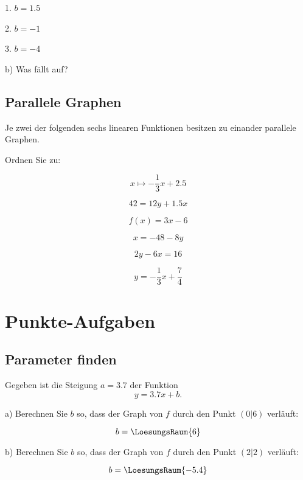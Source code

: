 1. $b=1.5$

2. $b=-1$

3. $b= -4$


b) Was fällt auf?
\newpage
\subsection{Parallele Graphen}
Je zwei der folgenden sechs linearen Funktionen besitzen zu einander parallele
Graphen.

Ordnen Sie zu:

$$x\mapsto -\frac13 x + 2.5$$

$$42 = 12y + 1.5x$$

$$f(x) = 3x-6$$

$$x=-48-8y$$

$$2y-6x = 16$$

$$y= - \frac13 x + \frac74$$
\section{Punkte-Aufgaben}

\subsection{Parameter finden}
Gegeben ist die Steigung $a=3.7$ der Funktion
$$y=3.7x + b.$$

a) Berechnen Sie $b$ so, dass der Graph von $f$ durch den Punkt $(0|6)$
verläuft:

$$b = \LoesungsRaum{6}$$



b) Berechnen Sie $b$ so, dass der Graph von $f$ durch den Punkt
$(2|2)$ verläuft:

$$b= \LoesungsRaum{-5.4}$$


